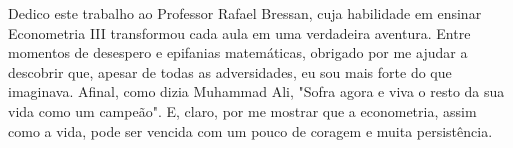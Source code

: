 \begin{dedicatoria}
   \vspace*{\fill}

{%
	\noindent\hspace{.5\textwidth}
	{\begin{minipage}{.5\textwidth}
			\begin{flushleft}
				Dedico este trabalho ao Professor Rafael Bressan, cuja habilidade em ensinar Econometria III transformou cada aula em uma verdadeira aventura. Entre momentos de desespero e epifanias matemáticas, obrigado por me ajudar a descobrir que, apesar de todas as adversidades, eu sou mais forte do que imaginava. Afinal, como dizia Muhammad Ali, "Sofra agora e viva o resto da sua vida como um campeão". E, claro, por me mostrar que a econometria, assim como a vida, pode ser vencida com um pouco de coragem e muita persistência.
			\end{flushleft}
	\end{minipage}}%
\vspace*{3cm}
}%

\end{dedicatoria}
